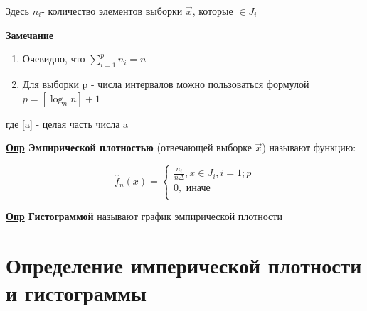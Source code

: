 \documentclass[12pt, a4paper]{report}
\begin{document}
	Здесь $n_i$- количество элементов выборки $\vec{x}$, которые $\in J_i$
	
	\vspace{0.3cm}\textbf{\underline{Замечание}}
	
	\begin{enumerate}
		\item Очевидно, что $\sum_{i=1}^p n_i = n$
		\item Для выборки p - числа интервалов можно пользоваться формулой $p = [\log_n n]+1$
	\end{enumerate}
	
	где [a] - целая часть числа a
	
	\vspace{0.5cm}\textbf{\underline{Опр} Эмпирической плотностью} (отвечающей выборке $\vec{x}$) называют функцию:
	
	\begin{equation*}
	\hat f_n(x) =
	\begin{cases}
	\frac{n_i}{n \Delta}, x \in J_i, i = \overline{1; p} \\
	0, \text{ иначе} \\
	\end{cases}
	\end{equation*}
	
	\textbf{\underline{Опр} Гистограммой} называют график эмпирической плотности
	
	
	\section{Определение имперической плотности и гистограммы}
	
	
\end{document}
